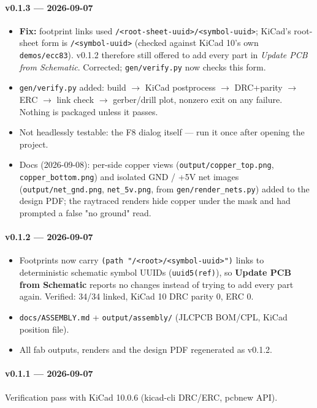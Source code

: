 \documentclass[11pt,a4paper]{article}
\begin{document}
\paragraph{v0.1.3 — 2026-09-07}
\begin{itemize}[leftmargin=8mm]
\item \textbf{Fix:} footprint links used \texttt{/<root-sheet-uuid>/<symbol-uuid>}; KiCad's root-sheet form is \texttt{/<symbol-uuid>} (checked against KiCad 10's own \texttt{demos/ecc83}). v0.1.2 therefore still offered to add every part in \emph{Update PCB from Schematic}. Corrected; \texttt{gen/verify.py} now checks this form.
\item \texttt{gen/verify.py} added: build $\to$ KiCad postprocess $\to$ DRC+parity $\to$ ERC $\to$ link check $\to$ gerber/drill plot, nonzero exit on any failure. Nothing is packaged unless it passes.
\item Not headlessly testable: the F8 dialog itself — run it once after opening the project.
\item Docs (2026-09-08): per-side copper views (\texttt{output/copper\_top.png}, \texttt{copper\_bottom.png}) and isolated GND / +5V net images (\texttt{output/net\_gnd.png}, \texttt{net\_5v.png}, from \texttt{gen/render\_nets.py}) added to the design PDF; the raytraced renders hide copper under the mask and had prompted a false "no ground" read.
\end{itemize}
\paragraph{v0.1.2 — 2026-09-07}
\begin{itemize}[leftmargin=8mm]
\item Footprints now carry \texttt{(path "/<root>/<symbol-uuid>")} links to deterministic schematic symbol UUIDs (\texttt{uuid5(ref)}), so \textbf{Update PCB from Schematic} reports no changes instead of trying to add every part again. Verified: 34/34 linked, KiCad 10 DRC parity 0, ERC 0.
\item \texttt{docs/ASSEMBLY.md} + \texttt{output/assembly/} (JLCPCB BOM/CPL, KiCad position file).
\item All fab outputs, renders and the design PDF regenerated as v0.1.2.
\end{itemize}
\paragraph{v0.1.1 — 2026-09-07}
Verification pass with KiCad 10.0.6 (kicad-cli DRC/ERC, pcbnew API).
\end{document}
